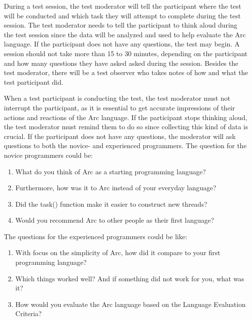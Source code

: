 During a test session, the test moderator will tell the participant where the test will be conducted and which task they will attempt to complete during the test session. The test moderator needs to tell the participant to think aloud during the test session since the data will be analyzed and used to help evaluate the Arc language. If the participant does not have any questions, the test may begin. A session should not take more than 15 to 30 minutes, depending on the participant and how many questions they have asked asked during the session. Besides the test moderator, there will be a test observer who takes notes of how and what the test participant did.

When a test participant is conducting the test, the test moderator must not interrupt the participant, as it is essential to get accurate impressions of their actions and reactions of the Arc language. If the participant stops thinking aloud, the test moderator must remind them to do so since collecting this kind of data is crucial. If the participant does not have any questions, the moderator will ask questions to both the novice- and experienced programmers. The question for the novice programmers could be:
\begin{enumerate}
    \item What do you think of Arc as a starting programming language?
    \item Furthermore, how was it to Arc instead of your everyday language?
    \item Did the task() function make it easier to construct new threads?
    \item Would you recommend Arc to other people as their first language?
\end{enumerate}

The questions for the experienced programmers could be like:
\begin{enumerate}
    \item With focus on the simplicity of Arc, how did it compare to your first programming language?
    \item Which things worked well? And if something did not work for you, what was it?
    \item How would you evaluate the Arc language based on the Language Evaluation Criteria?
\end{enumerate}


